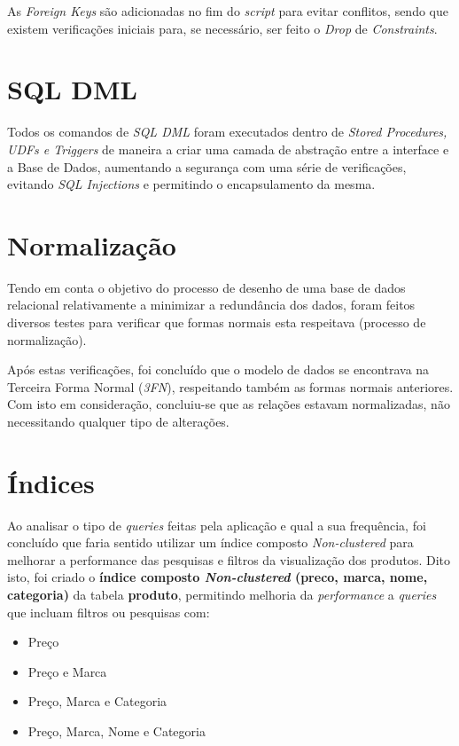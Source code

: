 \documentclass[10pt,portuguese]{article}
\begin{document}
\par As \textit{Foreign Keys} são adicionadas no fim do \textit{script} para evitar conflitos, sendo que existem verificações iniciais para, se necessário, ser feito o \textit{Drop} de \textit{Constraints}.

\clearpage

\section{SQL DML}

\par Todos os comandos de \textit{SQL DML} foram executados dentro de \textit{Stored Procedures, UDFs e Triggers} de maneira a criar uma camada de abstração entre a interface e a Base de Dados, aumentando a segurança com uma série de verificações, evitando \textit{SQL Injections} e permitindo o encapsulamento da mesma.

\section{Normalização}
\par Tendo em conta o objetivo do processo de desenho de uma base de dados relacional relativamente a minimizar a redundância dos dados, foram feitos diversos testes para verificar que formas normais esta respeitava (processo de normalização).

\par Após estas verificações, foi concluído que o modelo de dados se encontrava na Terceira Forma Normal (\textit{3FN}), respeitando também as formas normais anteriores. Com isto em consideração, concluiu-se que as relações estavam normalizadas, não necessitando qualquer tipo de alterações.

\section{Índices}

\par Ao analisar o tipo de \textit{queries} feitas pela aplicação e qual a sua frequência, foi concluído que faria sentido utilizar um índice composto \textit{Non-clustered} para melhorar a performance das pesquisas e filtros da visualização dos produtos. Dito isto, foi criado o \textbf{índice composto \textit{Non-clustered} (preco, marca, nome, categoria)} da tabela \textbf{produto}, permitindo melhoria da \textit{performance} a \textit{queries} que incluam filtros ou pesquisas com:
\begin{itemize}
    \item Preço 
    \item Preço e Marca
    \item Preço, Marca e Categoria
    \item Preço, Marca, Nome e Categoria
\end{itemize}
\end{document}
